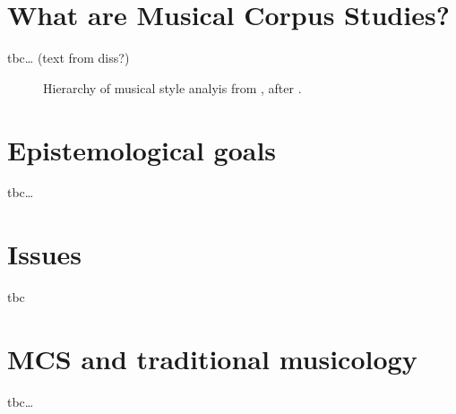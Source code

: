 \documentclass[letterpaper,10pt,english]{sphinxmanual}
\begin{document}
\section{What are Musical Corpus Studies?}
\label{\detokenize{2_introduction:what-are-musical-corpus-studies}}
tbc… (text from diss?)

\begin{figure}[htbp]
\centering
\capstart

\noindent{}
\caption{Hierarchy of musical style analyis from , after .}\label{\detokenize{2_introduction:id11}}\end{figure}


\section{Epistemological goals}
\label{\detokenize{2_introduction:epistemological-goals}}
tbc…


\section{Issues}
\label{\detokenize{2_introduction:issues}}
tbc 


\section{MCS and traditional musicology}
\label{\detokenize{2_introduction:mcs-and-traditional-musicology}}
tbc…
\end{document}
